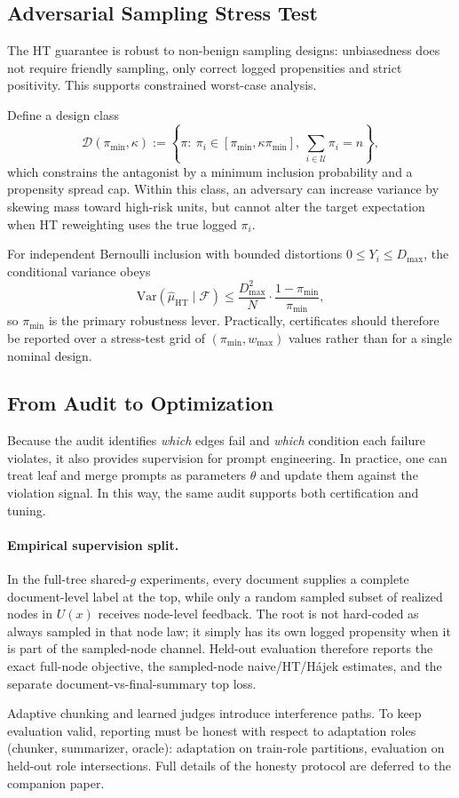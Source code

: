 \subsection{Adversarial Sampling Stress Test}

The HT guarantee is robust to non-benign sampling designs: unbiasedness does not require friendly sampling, only correct logged propensities and strict positivity. This supports constrained worst-case analysis.

Define a design class
\[
\mathcal{D}(\pi_{\min},\kappa)
:=\left\{\pi:\ \pi_i\in[\pi_{\min},\kappa\pi_{\min}],\ \sum_{i\in\mathcal{U}}\pi_i=n\right\},
\]
which constrains the antagonist by a minimum inclusion probability and a propensity spread cap. Within this class, an adversary can increase variance by skewing mass toward high-risk units, but cannot alter the target expectation when HT reweighting uses the true logged $\pi_i$.

For independent Bernoulli inclusion with bounded distortions $0\le Y_i\le D_{\max}$, the conditional variance obeys
\[
\mathrm{Var}\!\left(\hat{\mu}_{\mathrm{HT}}\mid\mathcal{F}\right)
\le
\frac{D_{\max}^2}{N}\cdot \frac{1-\pi_{\min}}{\pi_{\min}},
\]
so $\pi_{\min}$ is the primary robustness lever. Practically, certificates should therefore be reported over a stress-test grid of $(\pi_{\min}, w_{\max})$ values rather than for a single nominal design.

\subsection{From Audit to Optimization}

Because the audit identifies \emph{which} edges fail and \emph{which} condition each failure violates, it also provides supervision for prompt engineering. In practice, one can treat leaf and merge prompts as parameters $\theta$ and update them against the violation signal. In this way, the same audit supports both certification and tuning.

\paragraph{Empirical supervision split.}
In the full-tree shared-$g$ experiments, every document supplies a complete document-level label at the top, while only a random sampled subset of realized nodes in $U(x)$ receives node-level feedback. The root is not hard-coded as always sampled in that node law; it simply has its own logged propensity when it is part of the sampled-node channel. Held-out evaluation therefore reports the exact full-node objective, the sampled-node naive/HT/H\'ajek estimates, and the separate document-vs-final-summary top loss.

Adaptive chunking and learned judges introduce interference paths. To keep evaluation valid, reporting must be honest with respect to adaptation roles (chunker, summarizer, oracle): adaptation on train-role partitions, evaluation on held-out role intersections. Full details of the honesty protocol are deferred to the companion paper.
